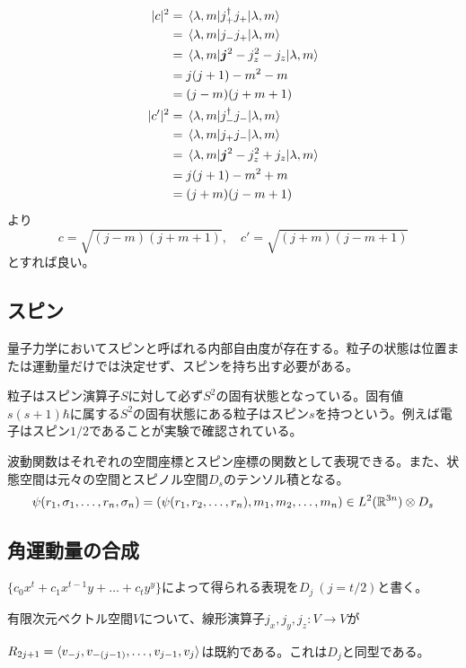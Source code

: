     \begin{align*}
        |c|^2   &= \ev{j_+^\dagger j_+}{\lambda, m}\\
                &= \ev{j_-j_+}{\lambda, m}\\
                &= \ev{\bm{j}^2 - j_z^2 - j_z}{\lambda, m}\\
                &= j(j + 1) - m^2 - m\\
                &= (j - m)(j + m + 1)\\
        |c'|^2  &= \ev{j_-^\dagger j_-}{\lambda, m}\\
                &= \ev{j_+j_-}{\lambda, m}\\
                &= \ev{\bm{j}^2 - j_z^2 + j_z}{\lambda, m}\\
                &= j(j + 1) - m^2 + m\\
                &= (j + m)(j - m + 1)
    \end{align*}
    より
        \[c = \sqrt{(j - m)(j + m + 1)}, \quad c' = \sqrt{(j + m)(j - m + 1)}\]
    とすれば良い。

\subsection{スピン}
    量子力学においてスピンと呼ばれる内部自由度が存在する。粒子の状態は位置または運動量だけでは決定せず、スピンを持ち出す必要がある。

    粒子はスピン演算子$S$に対して必ず$S^2$の固有状態となっている。固有値$s(s + 1)\hbar$に属する$S^2$の固有状態にある粒子はスピン$s$を持つという。例えば電子はスピン$1/2$であることが実験で確認されている。
    
    波動関数はそれぞれの空間座標とスピン座標の関数として表現できる。また、状態空間は元々の空間とスピノル空間$D_s$のテンソル積となる。
    \[\psi(r_1, \sigma_1, \dots, r_n, \sigma_n) = (\psi(r_1, r_2, \dots, r_n), m_1, m_2, \dots, m_n) \in L^2(\mathbb{R}^{3n}) \otimes D_s\]

\subsection{角運動量の合成}
    $\{c_0x^t + c_1x^{t-1}y + \dots + c_ty^y\}$によって得られる表現を$D_j\ (j = t/2)$と書く。

    有限次元ベクトル空間$V$について、線形演算子$j_x, j_y, j_z: V \rightarrow V$が

    $R_{2j+1} = \langle v_{-j}, v_{-(j-1)}, \dots, v_{j-1}, v_j \rangle$は既約である。これは$D_j$と同型である。

